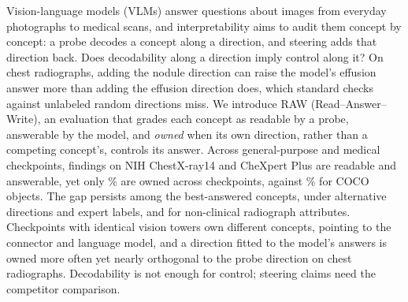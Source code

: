Vision-language models (VLMs) answer questions about images from everyday photographs to medical scans, and interpretability aims to audit them concept by concept: a probe decodes a concept along a direction, and steering adds that direction back. Does decodability along a direction imply control along it? On chest radiographs, adding the nodule direction can raise the model's effusion answer more than adding the effusion direction does, which standard checks against unlabeled random directions miss. We introduce RAW (Read--Answer--Write), an evaluation that grades each concept as readable by a probe, answerable by the model, and \emph{owned} when its own direction, rather than a competing concept's, controls its answer. Across \cfCheckpoints{} general-purpose and medical checkpoints, findings on NIH ChestX-ray14 and CheXpert Plus are readable and answerable, yet only \cfChestOwnedPct{}\% are owned across checkpoints, against \cfCocoOwnedPct{}\% for COCO objects. The gap persists among the best-answered concepts, under alternative directions and expert labels, and for non-clinical radiograph attributes. Checkpoints with identical vision towers own different concepts, pointing to the connector and language model, and a direction fitted to the model's answers is owned more often yet nearly orthogonal to the probe direction on chest radiographs. Decodability is not enough for control; steering claims need the competitor comparison.
